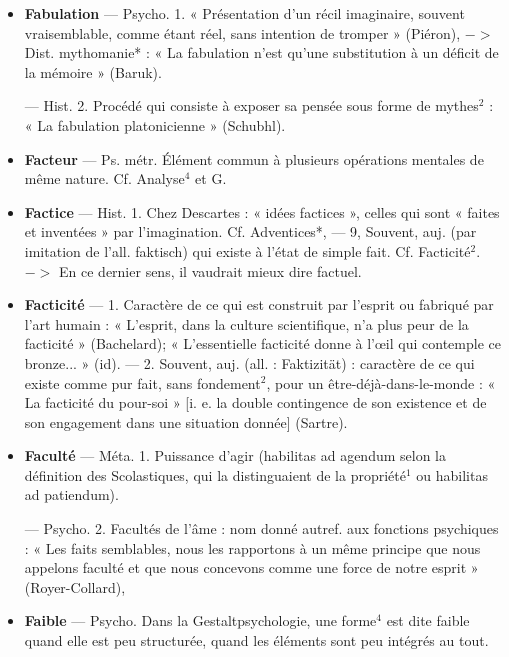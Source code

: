 
	\begin{itemize}[leftmargin=1cm, label=, itemsep=1pt]

\item {\bf Fabulation} — Psycho. 1. « Présentation d’un récil imaginaire, souvent vraisemblable, comme étant
réel, sans intention de tromper »
(Piéron), $->$ Dist. mythomanie* :
« La fabulation n’est qu’une substitution à un déficit de la mémoire »
(Baruk).

— Hist. 2. Procédé qui consiste
à exposer sa pensée sous forme de
mythes$^2$ : « La fabulation platonicienne » (Schubhl).

\item {\bf Facteur} — Ps. métr. Élément commun
à plusieurs opérations mentales de
même nature. Cf. Analyse$^4$ et G.

\item {\bf Factice} — Hist. 1. Chez Descartes :
« idées factices », celles qui sont
« faites et inventées » par l'imagination. Cf. Adventices*, — 9, Souvent, auj. (par imitation de l'all.
faktisch) qui existe à l’état de
simple fait. Cf. Facticité$^2$. $->$ En
ce dernier sens, il vaudrait mieux
dire factuel.

\item {\bf Facticité} — 1. Caractère de ce qui
est construit par l'esprit ou fabriqué
par l'art humain : « L'esprit, dans
la culture scientifique, n’a plus peur
de la facticité » (Bachelard); « L’essentielle facticité donne à l’œil qui
contemple ce bronze... » (id). —
2. Souvent, auj. (all. : Faktizität) :
caractère de ce qui existe comme
pur fait, sans fondement$^2$, pour un
être-déjà-dans-le-monde : « La facticité du pour-soi » [i. e. la double
contingence de son existence et de
son engagement dans une situation
donnée] (Sartre).

\item {\bf Faculté} — Méta. 1. Puissance d'agir
(habilitas ad agendum selon la définition des Scolastiques, qui la distinguaient de la propriété$^1$ ou habilitas ad patiendum).

— Psycho. 2. Facultés de l'âme :
nom donné autref. aux fonctions
psychiques : « Les faits semblables,
nous les rapportons à un même
principe que nous appelons faculté et
que nous concevons comme une force
de notre esprit » (Royer-Collard),

\item {\bf Faible} — Psycho. Dans la Gestaltpsychologie, une forme$^4$ est dite
faible quand elle est peu structurée,
quand les éléments sont peu intégrés au tout.


\end{itemize}
